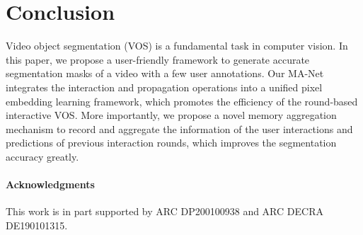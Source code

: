 \documentclass[10pt,twocolumn,letterpaper]{article}
\begin{document}
 \section{Conclusion}
Video object segmentation (VOS) is a fundamental task in computer vision. In this paper, we propose a user-friendly framework to generate accurate segmentation masks of a video with a few user annotations. Our MA-Net integrates the interaction and propagation operations into a unified pixel embedding learning framework, which promotes the efficiency of the round-based interactive VOS. More importantly, we propose a novel memory aggregation mechanism to record and aggregate the information of the user interactions and predictions of previous interaction rounds, which improves the segmentation accuracy greatly. 



 \paragraph{Acknowledgments}

This work is in part supported by ARC DP200100938 and ARC DECRA DE190101315.

{\small


}
\end{document}
